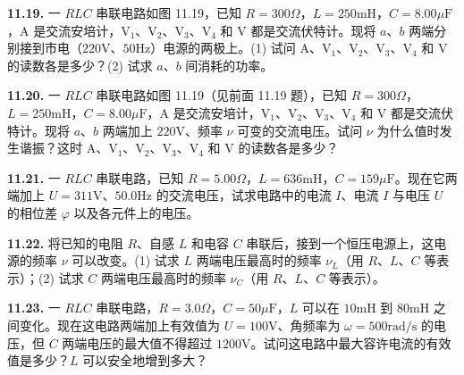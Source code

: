\begin{center}
\end{center}

\vfill
\newpage

\textbf{11.19.} 一 $RLC$ 串联电路如图 11.19，已知 $R = 300\Omega$，$L = 250\mathrm{mH}$，$C = 8.00\mu\mathrm{F}$，$\mathrm{A}$ 是交流安培计，$\mathrm{V}_{1}$、$\mathrm{V}_{2}$、$\mathrm{V}_{3}$、$\mathrm{V}_{4}$ 和 $\mathrm{V}$ 都是交流伏特计。现将 $a$、$b$ 两端分别接到市电（$220\mathrm{V}$、$50\mathrm{Hz}$）电源的两极上。(1) 试问 $\mathrm{A}$、$\mathrm{V}_{1}$、$\mathrm{V}_{2}$、$\mathrm{V}_{3}$、$\mathrm{V}_{4}$ 和 $\mathrm{V}$ 的读数各是多少？(2) 试求 $a$、$b$ 间消耗的功率。

\begin{center}
\end{center}

\vfill
\newpage

\textbf{11.20.} 一 $RLC$ 串联电路如图 11.19（见前面 11.19 题），已知 $R = 300\Omega$，$L = 250\mathrm{mH}$，$C = 8.00\mu\mathrm{F}$，$\mathrm{A}$ 是交流安培计，$\mathrm{V}_{1}$、$\mathrm{V}_{2}$、$\mathrm{V}_{3}$、$\mathrm{V}_{4}$ 和 $\mathrm{V}$ 都是交流伏特计。现将 $a$、$b$ 两端加上 $220\mathrm{V}$、频率 $\nu$ 可变的交流电压。试问 $\nu$ 为什么值时发生谐振？这时 $\mathrm{A}$、$\mathrm{V}_{1}$、$\mathrm{V}_{2}$、$\mathrm{V}_{3}$、$\mathrm{V}_{4}$ 和 $\mathrm{V}$ 的读数各是多少？

\begin{center}
\end{center}

\vfill
\newpage

\textbf{11.21.} 一 $RLC$ 串联电路，已知 $R = 5.00\Omega$，$L = 636\mathrm{mH}$，$C = 159\mu\mathrm{F}$。现在它两端加上 $U = 311\mathrm{V}$、$50.0\mathrm{Hz}$ 的交流电压，试求电路中的电流 $I$、电流 $I$ 与电压 $U$ 的相位差 $\varphi$ 以及各元件上的电压。

\vfill
\newpage

\textbf{11.22.} 将已知的电阻 $R$、自感 $L$ 和电容 $C$ 串联后，接到一个恒压电源上，这电源的频率 $\nu$ 可以改变。(1) 试求 $L$ 两端电压最高时的频率 $\nu_{L}$（用 $R$、$L$、$C$ 等表示）；(2) 试求 $C$ 两端电压最高时的频率 $\nu_{C}$（用 $R$、$L$、$C$ 等表示）。

\vfill
\newpage

\textbf{11.23.} 一 $RLC$ 串联电路，$R = 3.0\Omega$，$C = 50\mu\mathrm{F}$，$L$ 可以在 $10\mathrm{mH}$ 到 $80\mathrm{mH}$ 之间变化。现在这电路两端加上有效值为 $U = 100\mathrm{V}$、角频率为 $\omega = 500\mathrm{rad/s}$ 的电压，但 $C$ 两端电压的最大值不得超过 $1200\mathrm{V}$。试问这电路中最大容许电流的有效值是多少？$L$ 可以安全地增到多大？

